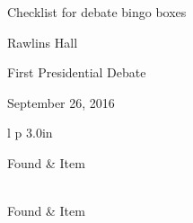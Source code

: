 \documentclass[12pt]{article}
\newcommand{\sep}{1mm}
\newcommand{\negsep}{-3mm}
\begin{document}
\begin{center}
\begin{Large}
Checklist for debate bingo boxes
\end{Large}
\vspace{0.15in}

Rawlins Hall

First Presidential Debate

September 26, 2016

\end{center}

\begin{longtable}{l p {3.0in} }

Found  & Item \\[\sep]
\hline\\[\negsep]
\endfirsthead

Found  & Item \\[\sep]
\hline\\[\negsep]
\endhead

\hline\hline
\endfoot



\end{longtable}
\end{document}
